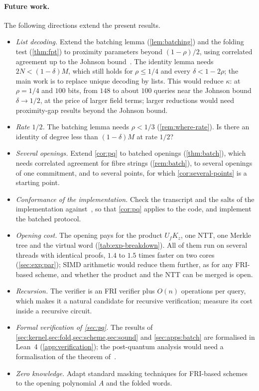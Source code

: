 \paragraph{Future work.}
The following directions extend the present results.
\begin{itemize}
  \item \emph{List decoding.} Extend the batching lemma (\cref{lem:batching}) and the folding test (\cref{thm:fpt}) to proximity parameters beyond $(1-\rho)/2$, using correlated agreement up to the Johnson bound~\cite{BCIKS23}. The identity lemma needs $2N < (1-\delta)M$, which still holds for $\rho \le 1/4$ and every $\delta < 1 - 2\rho$; the main work is to replace unique decoding by lists. This would reduce $\kappa$: at $\rho = 1/4$ and $100$ bits, from $148$ to about $100$ queries near the Johnson bound $\delta \to 1/2$, at the price of larger field terms; larger reductions would need proximity-gap results beyond the Johnson bound.
  \item \emph{Rate $1/2$.} The batching lemma needs $\rho < 1/3$ (\cref{rem:where-rate}). Is there an identity of degree less than $(1-\delta)M$ at rate $1/2$?
  \item \emph{Several openings.} Extend \cref{cor:pq} to batched openings (\cref{thm:batch}), which needs correlated agreement for fibre strings (\cref{rem:batch}), to several openings of one commitment, and to several points, for which \cref{cor:several-points} is a starting point.
  \item \emph{Conformance of the implementation.} Check the transcript and the salts of the implementation against~\cite[Construction~11.7]{CDHZ25}, so that \cref{cor:pq} applies to the code, and implement the batched protocol.
  \item \emph{Opening cost.} The opening pays for the product $U_f K_z$, one NTT, one Merkle tree and the virtual word (\cref{tab:exp-breakdown}). All of them run on several threads with identical proofs, $1.4$ to $1.5$ times faster on two cores (\cref{sec:exp:par}); SIMD arithmetic would reduce them further, as for any FRI-based scheme, and whether the product and the NTT can be merged is open.
  \item \emph{Recursion.} The verifier is an FRI verifier plus $O(n)$ operations per query, which makes it a natural candidate for recursive verification; measure its cost inside a recursive circuit.
  \item \emph{Formal verification of \cref{sec:pq}.} The results of \cref{sec:kernel,sec:fold,sec:scheme,sec:sound} and \cref{sec:apps:batch} are formalised in Lean~4 (\cref{app:verification}); the post-quantum analysis would need a formalisation of the theorem of~\cite{CDHZ25}.
  \item \emph{Zero knowledge.} Adapt standard masking techniques for FRI-based schemes to the opening polynomial $A$ and the folded words.
\end{itemize}

